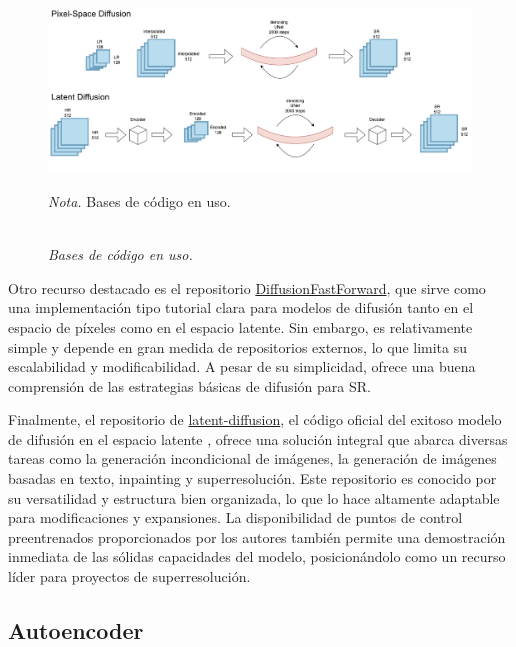 \begin{figure}[H]
    \caption{\doublespacing \\ \textit{Bases de código en uso.}} 
    \centering
    \includegraphics[width=1\linewidth]{images/lat_px_dif.png}
    \begin{justify}
        \textit{Nota.} Bases de código en uso.
    \end{justify}                    
    \label{fig:codebase}
\end{figure}

Otro recurso destacado es el repositorio \href{https://github.com/mikonvergence/DiffusionFastForward}{DiffusionFastForward}, que sirve como una implementación tipo tutorial clara para modelos de difusión tanto en el espacio de píxeles como en el espacio latente. Sin embargo, es relativamente simple y depende en gran medida de repositorios externos, lo que limita su escalabilidad y modificabilidad. A pesar de su simplicidad, ofrece una buena comprensión de las estrategias básicas de difusión para SR.

Finalmente, el repositorio de \href{https://github.com/mikonvergence/DiffusionFastForward}{latent-diffusion}, el código oficial del exitoso modelo de difusión en el espacio latente \autocite{rombach2022highresolution}, ofrece una solución integral que abarca diversas tareas como la generación incondicional de imágenes, la generación de imágenes basadas en texto, inpainting y superresolución. Este repositorio es conocido por su versatilidad y estructura bien organizada, lo que lo hace altamente adaptable para modificaciones y expansiones. La disponibilidad de puntos de control preentrenados proporcionados por los autores también permite una demostración inmediata de las sólidas capacidades del modelo, posicionándolo como un recurso líder para proyectos de superresolución.


\subsection{Autoencoder}

